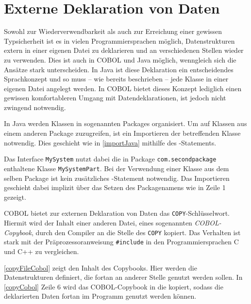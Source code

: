 \section{Externe Deklaration von Daten} 
Sowohl zur Wiederverwendbarkeit als auch zur Erreichung einer gewissen Typsicherheit ist es in vielen Programmiersprachen möglich, Datenstrukturen extern in einer eigenen Datei zu deklarieren und an verschiedenen Stellen wieder zu verwenden. Dies ist auch in COBOL und Java möglich, wenngleich sich die Ansätze stark unterscheiden. In Java ist diese Deklaration ein entscheidendes Sprachkonzept und so muss -- wie bereits beschrieben -- jede Klasse in einer eigenen Datei angelegt werden. In COBOL bietet dieses Konzept lediglich einen gewissen komfortableren Umgang mit Datendeklarationen, ist jedoch nicht zwingend notwendig.

In Java werden Klassen in sogenannten Packages organisiert. Um auf Klassen aus einem anderen Package zuzugreifen, ist ein Importieren der betreffenden Klasse notwendig. Dies geschieht wie in \autoref{importJava} mithilfe des -Statements.

Das Interface \texttt{MySystem} nutzt dabei die in Package \texttt{com.secondpackage} enthaltene Klasse \texttt{MySystemPart}. Bei der Verwendung einer Klasse aus dem selben Package ist kein zusätzliches -Statement notwendig. Das Importieren geschieht dabei implizit über das Setzen des Packagenamens wie in Zeile 1 gezeigt.

COBOL bietet zur externen Deklaration von Daten das \texttt{COPY}-Schlüsselwort. Hiermit wird der Inhalt einer anderen Datei, eines sogenannten \textit{COBOL-Copybook}, durch den Compiler an die Stelle des \texttt{COPY} kopiert. Das Verhalten ist stark mit der Präprozessoranweisung \texttt{#include} in den Programmiersprachen C und C++ zu vergleichen.

\autoref{copyFileCobol} zeigt den Inhalt des Copybooks. Hier werden die Datenstrukturen definiert, die fortan an anderer Stelle genutzt werden sollen. In \autoref{copyCobol} Zeile 6 wird das COBOL-Copybook in die  kopiert, sodass die deklarierten Daten fortan im Programm genutzt werden können.

